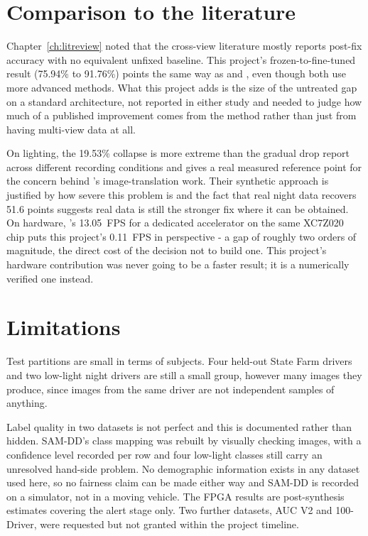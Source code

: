 \section{Comparison to the literature}

Chapter~\ref{ch:litreview} noted that the cross-view literature mostly reports post-fix accuracy with no equivalent unfixed baseline. This project's frozen-to-fine-tuned result (75.94\% to 91.76\%) points the same way as \citet{bhalla2025crossview} and \citet{sengar2023poseviNet}, even though both use more advanced methods. What this project adds is the size of the untreated gap on a standard architecture, not reported in either study and needed to judge how much of a published improvement comes from the method rather than just from having multi-view data at all.

On lighting, the 19.53\% collapse is more extreme than the gradual drop \citet{wang2023driver} report across different recording conditions and gives a real measured reference point for the concern behind \citet{shen2023visible}'s image-translation work. Their synthetic approach is justified by how severe this problem is and the fact that real night data recovers 51.6 points suggests real data is still the stronger fix where it can be obtained. On hardware, \citet{lu2025hardware}'s 13.05~FPS for a dedicated accelerator on the same XC7Z020 chip puts this project's 0.11~FPS in perspective - a gap of roughly two orders of magnitude, the direct cost of the decision not to build one. This project's hardware contribution was never going to be a faster result; it is a numerically verified one instead.

\section{Limitations}
\label{sec:eval-limitations}

Test partitions are small in terms of subjects. Four held-out State Farm drivers and two low-light night drivers are still a small group, however many images they produce, since images from the same driver are not independent samples of anything.

Label quality in two datasets is not perfect and this is documented rather than hidden. SAM-DD's class mapping was rebuilt by visually checking images, with a confidence level recorded per row and four low-light classes still carry an unresolved hand-side problem. No demographic information exists in any dataset used here, so no fairness claim can be made either way and SAM-DD is recorded on a simulator, not in a moving vehicle. The FPGA results are post-synthesis estimates covering the alert stage only. Two further datasets, AUC V2 and 100-Driver, were requested but not granted within the project timeline.

